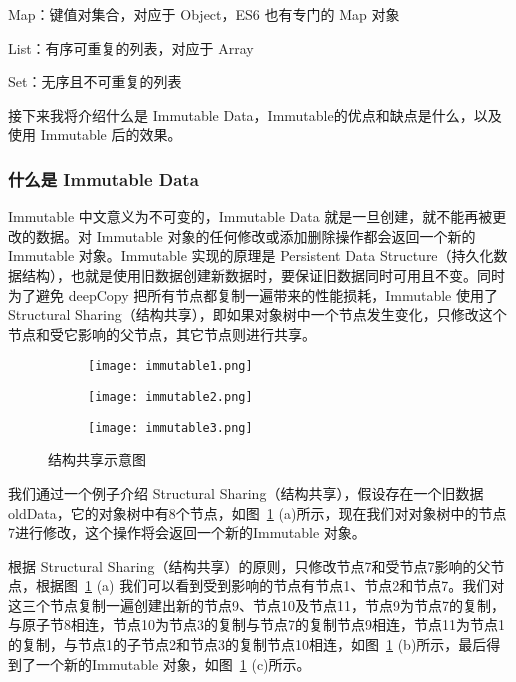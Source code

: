 Map：键值对集合，对应于 Object，ES6 也有专门的 Map 对象

List：有序可重复的列表，对应于 Array

Set：无序且不可重复的列表

接下来我将介绍什么是 Immutable Data，Immutable的优点和缺点是什么，以及使用 Immutable 后的效果。
\subsubsection{什么是 Immutable Data}
Immutable 中文意义为不可变的，Immutable Data 就是一旦创建，就不能再被更改的数据。对 Immutable 对象的任何修改或添加删除操作都会返回一个新的 Immutable 对象。Immutable 实现的原理是 Persistent Data Structure（持久化数据结构），也就是使用旧数据创建新数据时，要保证旧数据同时可用且不变。同时为了避免 deepCopy 把所有节点都复制一遍带来的性能损耗，Immutable 使用了 Structural Sharing（结构共享），即如果对象树中一个节点发生变化，只修改这个节点和受它影响的父节点，其它节点则进行共享。

\begin{figure}[!htp]
    \centering
    \begin{subfigure}{0.4\textwidth}
      \centering
      \texttt{[image: immutable1.png]}
      \caption{}
    \end{subfigure}
    \hspace{1cm}
    \begin{subfigure}{0.4\textwidth}
      \centering
      \texttt{[image: immutable2.png]}
      \caption{}
    \end{subfigure}
    \begin{subfigure}{0.4\textwidth}
      \centering
      \texttt{[image: immutable3.png]}
      \caption{}
    \end{subfigure}
    \caption{结构共享示意图}
    \label{fig:immutable}
  \end{figure}

  我们通过一个例子介绍 Structural Sharing（结构共享），假设存在一个旧数据 oldData，它的对象树中有8个节点，如图~\ref{fig:immutable} (a)所示，现在我们对对象树中的节点7进行修改，这个操作将会返回一个新的Immutable 对象。

   根据 Structural Sharing（结构共享）的原则，只修改节点7和受节点7影响的父节点，根据图~\ref{fig:immutable} (a) 我们可以看到受到影响的节点有节点1、节点2和节点7。我们对这三个节点复制一遍创建出新的节点9、节点10及节点11，节点9为节点7的复制，与原子节8相连，节点10为节点3的复制与节点7的复制节点9相连，节点11为节点1的复制，与节点1的子节点2和节点3的复制节点10相连，如图~\ref{fig:immutable} (b)所示，最后得到了一个新的Immutable 对象，如图~\ref{fig:immutable} (c)所示。

